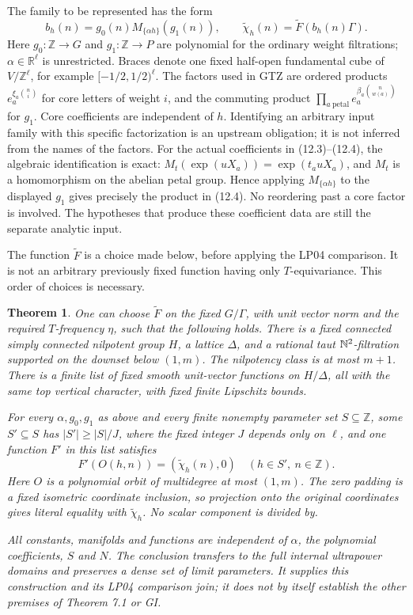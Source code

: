 \documentclass[11pt]{article}
\newtheorem{theorem}{Theorem}
\newcommand{\R}{\mathbb R}\newcommand{\Z}{\mathbb Z}
\begin{document}
The family to be represented has the form
\begin{equation}\label{eq:inputfamily}
 b_h(n)=g_0(n)M_{\{\alpha h\}}(g_1(n)),\qquad
 \widetilde\chi_h(n)=\widetilde F(b_h(n)\Gamma).
\end{equation}
Here $g_0:\Z\to G$ and $g_1:\Z\to P$ are polynomial for the ordinary
weight filtrations; $\alpha\in\R^\ell$ is unrestricted. Braces denote
one fixed half-open fundamental cube of $V/\Z^\ell$, for example
$[-1/2,1/2)^\ell$. The factors used in GTZ are ordered products
$e_a^{\xi_a\binom ni}$ for core letters of weight $i$, and the commuting
product $\prod_{a\ \mathrm{petal}}e_a^{\beta_a\binom n{w(a)}}$ for $g_1$.
Core coefficients are independent of $h$. Identifying an arbitrary input
family with this specific factorization is an upstream obligation; it is
not inferred from the names of the factors.
For the actual coefficients in (12.3)--(12.4), the algebraic identification
is exact: $M_t(\exp(uX_a))=\exp(t_a uX_a)$, and $M_t$ is a
homomorphism on the abelian petal group. Hence applying
$M_{\{\alpha h\}}$ to the displayed $g_1$ gives precisely the product
in (12.4). No reordering past a core factor is involved. The hypotheses
that produce these coefficient data are still the separate analytic input.

The function $\widetilde F$ is a choice made below, before applying the
LP04 comparison. It is not an arbitrary previously fixed function having
only $T$-equivariance. This order of choices is necessary.

\begin{theorem}\label{thm:join}
One can choose $\widetilde F$ on the fixed $G/\Gamma$, with unit vector
norm and the required $T$-frequency $\eta$, such that the following holds.
There is a fixed connected simply connected nilpotent group $H$, a lattice
$\Delta$, and a rational taut $\mathbb N^2$-filtration supported on the downset
below $(1,m)$. The nilpotency class is at most $m+1$. There is a finite
list of fixed smooth unit-vector functions on $H/\Delta$, all with the
same top vertical character, with fixed finite Lipschitz bounds.

For every $\alpha,g_0,g_1$ as above and every finite nonempty parameter set
$S\subseteq\Z$, some $S'\subseteq S$ has $|S'|\geq |S|/J$, where the
fixed integer $J$ depends only on $\ell$, and one function $F'$ in this
list satisfies
\begin{equation}\label{eq:exactoutput}
 F'(O(h,n))=(\widetilde\chi_h(n),0)
 \quad(h\in S',\ n\in\Z).
\end{equation}
Here $O$ is a polynomial orbit of multidegree at most $(1,m)$.
The zero padding is a fixed isometric coordinate inclusion, so projection
onto the original coordinates gives literal equality with
$\widetilde\chi_h$. No scalar component is divided by.

All constants, manifolds and functions are independent of $\alpha$,
the polynomial coefficients, $S$ and $N$. The conclusion transfers to the
full internal ultrapower domains and preserves a dense set of limit
parameters. It supplies this construction and its LP04 comparison join;
it does not by itself establish the other premises of Theorem 7.1 or GI.
\end{theorem}
\end{document}
